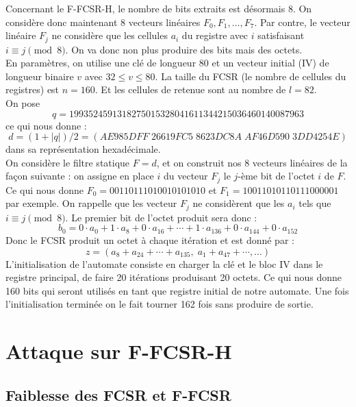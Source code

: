 \documentclass[11pt]{report}
\begin{document}
Concernant le F-FCSR-H, le nombre de bits extraits est désormais 8. On considère donc maintenant 8 vecteurs linéaires $F_0,F_1,...,F_7$. Par contre, le vecteur linéaire $F_j$ ne considère que les cellules $a_i$ du registre avec $i$ satisfaisant $i \equiv j \pmod 8$. On va donc non plus produire des bits mais des octets. \\
En paramètres, on utilise une clé de longueur 80 et un vecteur initial (IV) de longueur binaire $v$ avec $32 \leq v \leq 80$. La taille du FCSR (le nombre de cellules du registres) est $n=160$. Et les cellules de retenue sont au nombre de $l = 82$.
\\
On pose
$$
q=1993524591318275015328041611344215036460140087963$$
ce qui nous donne : 
$$
d=(1+|q|)/2 = (AE985DFF\; 26619FC5\; 8623DC8A\; AF46D590\; 3DD4254E)$$
dans sa représentation hexadécimale. 
\\
On considère le filtre statique $F=d$, et on construit nos 8 vecteurs linéaires de la façon suivante : on assigne en place $i$ du vecteur $F_j$ le $j$-ème bit de l'octet $i$ de $F$.
\\
Ce qui nous donne $F_0 = 00110111010010101010$ et $F_1= 10011010110111000001$ par exemple. 
On rappelle que les vecteur $F_j$ ne considèrent que les $a_i$ tels que $i \equiv j \pmod 8$. Le premier bit de l'octet produit sera donc : 
$$
b_0 = 0 \cdot a_0 + 1 \cdot a_8 + 0 \cdot a_{16} + \cdots + 1 \cdot a_{136} + 0 \cdot a_{144} + 0 \cdot a_{152}
$$
Donc le FCSR produit un octet à chaque itération et est donné par :
$$
z= (a_8+a_{24}+\cdots + a_{135},\; a_1 + a_{47} + \cdots, ...)
$$
L'initialisation de l'automate consiste en charger la clé et le bloc IV dans le registre principal, de faire 20 itérations produisant 20 octets. Ce qui nous donne 160 bits qui seront utilisés en tant que registre initial de notre automate. Une fois l'initialisation terminée on le fait tourner 162 fois sans produire de sortie. 

\chapter{Attaque sur F-FCSR-H}
\section{Faiblesse des FCSR et F-FCSR}
\end{document}
